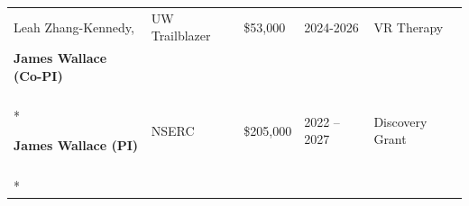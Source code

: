 \documentclass[12pt]{article}
\begin{document}
\begin{longtable}[c]{p{4.5cm} l l l p{4.5cm}}

Leah Zhang-Kennedy, & UW Trailblazer & \$53,000 & 2024-2026 & VR Therapy \\
\textbf{James Wallace (Co-PI)} \\
\\*



\textbf{James Wallace (PI)}      &   NSERC   & \$205,000 &   2022 -- 2027 &   Discovery Grant \\
\\*







\end{longtable}
\end{document}
